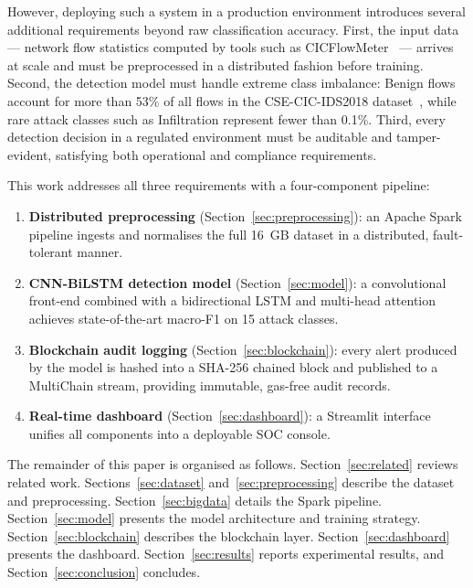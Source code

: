 \documentclass[12pt]{article}
\theoremstyle{plain}
\begin{document}
However, deploying such a system in a production environment introduces several additional requirements beyond raw classification accuracy. First, the input data — network flow statistics computed by tools such as CICFlowMeter~\cite{cicflowmeter} — arrives at scale and must be preprocessed in a distributed fashion before training. Second, the detection model must handle extreme class imbalance: Benign flows account for more than 53\% of all flows in the CSE-CIC-IDS2018 dataset~\cite{cic2018}, while rare attack classes such as Infiltration represent fewer than 0.1\%. Third, every detection decision in a regulated environment must be auditable and tamper-evident, satisfying both operational and compliance requirements.

This work addresses all three requirements with a four-component pipeline:

\begin{enumerate}
  \item \textbf{Distributed preprocessing} (Section~\ref{sec:preprocessing}): an Apache Spark pipeline ingests and normalises the full 16~GB dataset in a distributed, fault-tolerant manner.
  \item \textbf{CNN-BiLSTM detection model} (Section~\ref{sec:model}): a convolutional front-end combined with a bidirectional LSTM and multi-head attention achieves state-of-the-art macro-F1 on 15 attack classes.
  \item \textbf{Blockchain audit logging} (Section~\ref{sec:blockchain}): every alert produced by the model is hashed into a SHA-256 chained block and published to a MultiChain stream, providing immutable, gas-free audit records.
  \item \textbf{Real-time dashboard} (Section~\ref{sec:dashboard}): a Streamlit interface unifies all components into a deployable SOC console.
\end{enumerate}

The remainder of this paper is organised as follows. Section~\ref{sec:related} reviews related work. Sections~\ref{sec:dataset} and~\ref{sec:preprocessing} describe the dataset and preprocessing. Section~\ref{sec:bigdata} details the Spark pipeline. Section~\ref{sec:model} presents the model architecture and training strategy. Section~\ref{sec:blockchain} describes the blockchain layer. Section~\ref{sec:dashboard} presents the dashboard. Section~\ref{sec:results} reports experimental results, and Section~\ref{sec:conclusion} concludes.

\newpage
\end{document}
